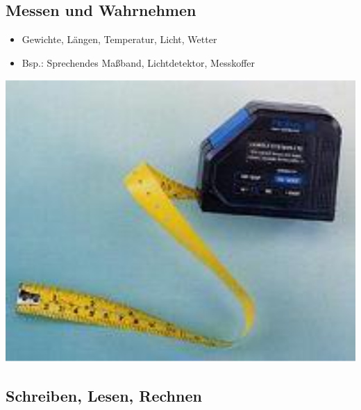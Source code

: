 \documentclass[paper=a4, fontsize=11pt]{scrartcl} %
\numberwithin{equation}{section} %
\numberwithin{figure}{section} %
\numberwithin{table}{section} %
\begin{document}
\subsection{Messen und Wahrnehmen}

\begin{minipage}[c]{0.55\textwidth}
\begin{itemize}
\item Gewichte, Längen, Temperatur, Licht, Wetter
\item Bsp.: Sprechendes Maßband, Lichtdetektor, Messkoffer
\end{itemize}
\end{minipage}
\begin{minipage}[c]{0.3\textwidth}
\includegraphics[width=\textwidth]{imgs/massband}
\end{minipage}

\subsection{Schreiben, Lesen, Rechnen}
\end{document}
